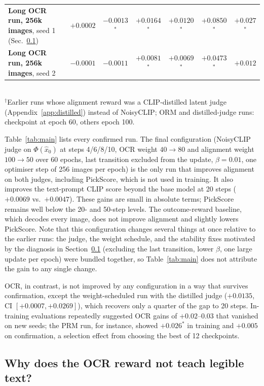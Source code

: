\documentclass{article}
\newcommand{\sig}{$^{*}$}
\newcommand{\xhat}{\hat{x}_0}
\begin{document}
\begin{table}[t]
\begin{tabular}{lcccccc}
    \textbf{Long OCR run, 256k images}, seed 1 (Sec.~\ref{sec:res_diag}) & $+0.0002$ & $-0.0013$\sig & $\mathbf{+0.0164}$\sig & $\mathbf{+0.0120}$\sig & $\mathbf{+0.0850}$\sig & $\mathbf{+0.027}$\sig \\
    \textbf{Long OCR run, 256k images}, seed 2 & $-0.0001$ & $-0.0011$ & $+0.0081$\sig & $+0.0069$\sig & $+0.0473$\sig & $+0.012$ \\
    \bottomrule
  \end{tabular}
  \\[2pt]
  {\footnotesize $^{\dagger}$Earlier runs whose alignment reward was a CLIP-distilled latent judge (Appendix~\ref{app:distilled})
  instead of NoisyCLIP; ORM and distilled-judge runs: checkpoint at epoch 60, others epoch 100.}
\end{table}

Table~\ref{tab:main} lists every confirmed run. The final configuration (NoisyCLIP judge on $\Phi(\xhat)$ at steps 4/6/8/10,
OCR weight $40\to80$ and alignment weight $100\to50$ over 60 epochs, last transition excluded from the update, $\beta=0.01$, one
optimiser step of 256 images per epoch) is the only run that improves alignment on both judges, including PickScore, which is
not used in training. It also improves the text-prompt CLIP score beyond the base model at 20 steps
($+0.0069$ vs.\ $+0.0047$). These gains are small in absolute terms; PickScore remains well below the 20- and 50-step levels. The
outcome-reward baseline, which decodes every image, does not improve alignment and slightly lowers PickScore. Note that this
configuration changes several things at once relative to the earlier runs: the judge, the weight schedule, and the stability
fixes motivated by the diagnosis in Section~\ref{sec:res_diag} (excluding the last transition, lower $\beta$, one large update per
epoch) were bundled together, so Table~\ref{tab:main} does not attribute the gain to any single change.

OCR, in contrast, is not improved by any configuration in a way that survives confirmation, except the weight-scheduled
run with the distilled judge ($+0.0135$, CI $[+0.0007, +0.0269]$), which recovers only a quarter of the gap to 20 steps.
In-training evaluations repeatedly suggested OCR gains of $+0.02$--$0.03$ that vanished on new seeds; the PRM run, for
instance, showed $+0.026^{*}$ in training and $+0.005$ on confirmation, a selection effect from choosing the best of 12
checkpoints.

\subsection{Why does the OCR reward not teach legible text?}
\label{sec:res_diag}
\end{document}
